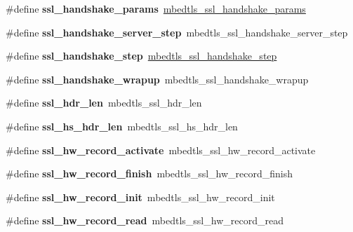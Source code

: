 \begin{DoxyCompactItemize}
\#define {\bfseries ssl\+\_\+handshake\+\_\+params}~\mbox{\hyperlink{structmbedtls__ssl__handshake__params}{mbedtls\+\_\+ssl\+\_\+handshake\+\_\+params}}
\item 
\mbox{\label{compat-1_83_8h_ae8861b0669933a2358ebd4fb3e546423}} 
\#define {\bfseries ssl\+\_\+handshake\+\_\+server\+\_\+step}~mbedtls\+\_\+ssl\+\_\+handshake\+\_\+server\+\_\+step
\item 
\mbox{\label{compat-1_83_8h_a597171e7375b9e201b18cc7b304b66b0}} 
\#define {\bfseries ssl\+\_\+handshake\+\_\+step}~\mbox{\hyperlink{ssl_8h_aac1583fe56eda081580742999968bbcf}{mbedtls\+\_\+ssl\+\_\+handshake\+\_\+step}}
\item 
\mbox{\label{compat-1_83_8h_ade8d562d6be1b8cda3bbb7e2b352d356}} 
\#define {\bfseries ssl\+\_\+handshake\+\_\+wrapup}~mbedtls\+\_\+ssl\+\_\+handshake\+\_\+wrapup
\item 
\mbox{\label{compat-1_83_8h_ace14e6ebee561667231298f3cadbe0e0}} 
\#define {\bfseries ssl\+\_\+hdr\+\_\+len}~mbedtls\+\_\+ssl\+\_\+hdr\+\_\+len
\item 
\mbox{\label{compat-1_83_8h_aa95621ea408c1ca646aebddc6f9f7ea4}} 
\#define {\bfseries ssl\+\_\+hs\+\_\+hdr\+\_\+len}~mbedtls\+\_\+ssl\+\_\+hs\+\_\+hdr\+\_\+len
\item 
\mbox{\label{compat-1_83_8h_affcc57154943f255af0a5ec66a9c82b6}} 
\#define {\bfseries ssl\+\_\+hw\+\_\+record\+\_\+activate}~mbedtls\+\_\+ssl\+\_\+hw\+\_\+record\+\_\+activate
\item 
\mbox{\label{compat-1_83_8h_affa8016c37d5bacf785e4eced6fec95d}} 
\#define {\bfseries ssl\+\_\+hw\+\_\+record\+\_\+finish}~mbedtls\+\_\+ssl\+\_\+hw\+\_\+record\+\_\+finish
\item 
\mbox{\label{compat-1_83_8h_af5ea620603c8e84bc201177427b30026}} 
\#define {\bfseries ssl\+\_\+hw\+\_\+record\+\_\+init}~mbedtls\+\_\+ssl\+\_\+hw\+\_\+record\+\_\+init
\item 
\mbox{\label{compat-1_83_8h_a75b7262bbe83f7641af6dec366d96f88}} 
\#define {\bfseries ssl\+\_\+hw\+\_\+record\+\_\+read}~mbedtls\+\_\+ssl\+\_\+hw\+\_\+record\+\_\+read

\end{DoxyCompactItemize}
